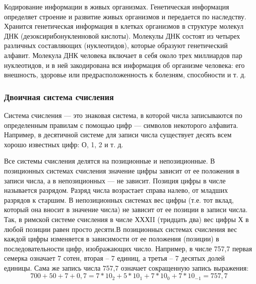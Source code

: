 \documentclass[a4paper]{article}
\begin{document}
 Кодирование информации в живых организмах. Генетическая информация определяет строение и развитие живых организмов и передается по наследству. Хранится генетическая информация в клетках организмов в структуре молекул ДНК (дезоксирибонуклеиновой кислоты). Молекулы ДНК состоят из четырех различных составляющих (нуклеотидов), которые образуют генетический алфавит. Молекула ДНК человека включает в себя около трех миллиардов пар нуклеотидов, и в ней закодирована вся информация об организме человека: его внешность, здоровье или предрасположенность к болезням, способности и т. д.

\subsubsection{Двоичная система счисления}
Система счисления — это знаковая система, в которой числа записываются по определенным правилам с помощью цифр — символов некоторого алфавита. Например, в десятичной системе для записи числа существует десять всем хорошо известных цифр: О, 1, 2 и т. д.

Все системы счисления делятся на позиционные и непозиционные. В позиционных системах счисления значение цифры зависит от ее положения в записи числа, а в непозиционных — не зависит. Позиция цифры в числе называется разрядом. Разряд числа возрастает справа налево, от младших разрядов к старшим. В непозиционных системах вес цифры (т.е. тот вклад, который она вносит в значение числа) не зависит от ее позиции в записи числа. Так, в римской системе счисления в числе ХХХII (тридцать два) вес цифры Х в любой позиции равен просто десяти.В позиционных системах счисления вес каждой цифры изменяется в зависимости от ее положения (позиции) в последовательности цифр, изображающих число. Например, в числе 757,7 первая семерка означает 7 сотен, вторая – 7 единиц, а третья – 7 десятых долей единицы. Сама же запись числа 757,7 означает сокращенную запись выражения:
\begin{equation}
  700 + 50 + 7 + 0,7 = 7*10_{2} + 5*10_{1} + 7*10_{0} + 7*10_{-1} = 757,7
\end{equation}
\end{document}
